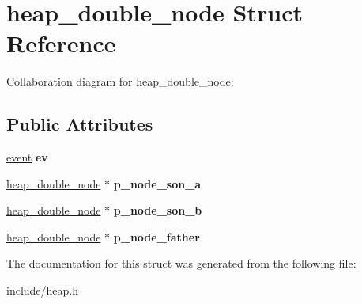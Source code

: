 \hypertarget{structheap__double__node}{}\section{heap\+\_\+double\+\_\+node Struct Reference}
\label{structheap__double__node}


Collaboration diagram for heap\+\_\+double\+\_\+node\+:
\subsection*{Public Attributes}
\begin{DoxyCompactItemize}
\item 
\hyperlink{structevent}{event} {\bfseries ev}\hypertarget{structheap__double__node_a50c3d725fc665ea2c39e1ae25279f89c}{}\label{structheap__double__node_a50c3d725fc665ea2c39e1ae25279f89c}

\item 
\hyperlink{structheap__double__node}{heap\+\_\+double\+\_\+node} $\ast$ {\bfseries p\+\_\+node\+\_\+son\+\_\+a}\hypertarget{structheap__double__node_a6321022a88b54a08ad921aa3b939d00d}{}\label{structheap__double__node_a6321022a88b54a08ad921aa3b939d00d}

\item 
\hyperlink{structheap__double__node}{heap\+\_\+double\+\_\+node} $\ast$ {\bfseries p\+\_\+node\+\_\+son\+\_\+b}\hypertarget{structheap__double__node_afd750294413bb0bed3706dc7d4499d34}{}\label{structheap__double__node_afd750294413bb0bed3706dc7d4499d34}

\item 
\hyperlink{structheap__double__node}{heap\+\_\+double\+\_\+node} $\ast$ {\bfseries p\+\_\+node\+\_\+father}\hypertarget{structheap__double__node_aad5c3edf774983e4588522c1959a78bd}{}\label{structheap__double__node_aad5c3edf774983e4588522c1959a78bd}

\end{DoxyCompactItemize}


The documentation for this struct was generated from the following file\+:\begin{DoxyCompactItemize}
\item 
include/heap.\+h\end{DoxyCompactItemize}
